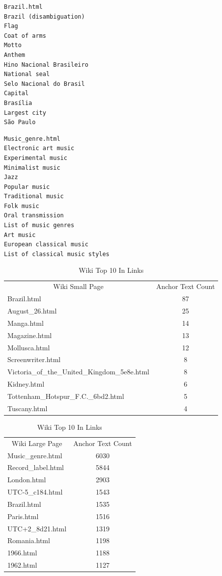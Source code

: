 \documentclass[11pt]{article}
\newenvironment{code}{\captionsetup{type=listing}}{}
\begin{document}
\begin{minipage}{.5\textwidth}
\begin{verbatim}
Brazil.html
Brazil (disambiguation) 
Flag 
Coat of arms 
Motto 
Anthem 
Hino Nacional Brasileiro 
National seal 
Selo Nacional do Brasil 
Capital 
Brasília 
Largest city 
São Paulo
\end{verbatim}
 \end{minipage}
    \begin{minipage}{0.5\textwidth}
\begin{verbatim}
Music_genre.html
Electronic art music
Experimental music
Minimalist music
Jazz
Popular music
Traditional music
Folk music
Oral transmission
List of music genres
Art music
European classical music
List of classical music styles
\end{verbatim}
\end{minipage}

\begin{table}[H]
\centering
\caption{Wiki Top 10 In Links}
\label{tb:wil} 
\begin{tabular}{lc|}
\multicolumn{1}{c}{Wiki Small Page} & \multicolumn{1}{c}{Anchor Text Count}\\
Brazil.html & 87 \\
August\_26.html & 25 \\
Manga.html & 14 \\
Magazine.html & 13 \\
Mollusca.html & 12 \\
Screenwriter.html & 8 \\
Victoria\_of\_the\_United\_Kingdom\_5e8e.html & 8 \\
Kidney.html & 6 \\
Tottenham\_Hotspur\_F.C.\_6bd2.html & 5 \\
Tuscany.html & 4  
\end{tabular}
    \begin{tabular}{lc}
\multicolumn{1}{c}{Wiki Large Page} & Anchor Text Count\\
Music\_genre.html  & 6030  \\
Record\_label.html & 5844  \\
London.html        & 2903  \\
UTC-5\_c184.html   & 1543  \\
Brazil.html        & 1535  \\
Paris.html         & 1516  \\
UTC+2\_8d21.html   & 1319  \\
Romania.html       & 1198  \\
1966.html          & 1188  \\
1962.html          & 1127 
\end{tabular}
\end{table}
\newpage
\begin{code}
	 \label{code:wil}
\end{code}
\newpage
\end{document}
